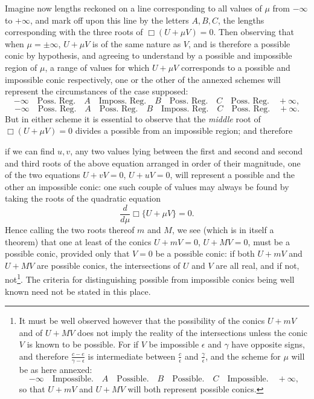 \documentclass[11pt]{article}
\newcommand{\sourcepage}[1]{\marginpar{\scriptsize p.~#1}}
\begin{document}
Imagine now lengths reckoned on a line corresponding to all values of $\mu$ from $-\infty$ to $+\infty$, and mark off upon this line by the letters $A,B,C$, the lengths corresponding with the three roots of $\Box(U+\mu V)=0$. Then observing that when $\mu=\pm\infty$, $U+\mu V$ is of the same nature as $V$, and is therefore a possible conic by hypothesis, and agreeing to understand by a possible and impossible region of $\mu$, a range of values for which $U+\mu V$ corresponds to a possible and impossible conic respectively, one or the other of the annexed schemes will represent the circumstances of the case supposed:
\[
-\infty\quad\text{Poss. Reg.}\quad A\quad\text{Imposs. Reg.}\quad B\quad\text{Poss. Reg.}\quad C\quad\text{Poss. Reg.}\quad+\infty,
\]
\[
-\infty\quad\text{Poss. Reg.}\quad A\quad\text{Poss. Reg.}\quad B\quad\text{Imposs. Reg.}\quad C\quad\text{Poss. Reg.}\quad+\infty.
\]
But in either scheme it is essential to observe that the \emph{middle} root of $\Box(U+\mu V)=0$ divides a possible from an impossible region; and therefore

\sourcepage{125}
if we can find $u,v$, any two values lying between the first and second and second and third roots of the above equation arranged in order of their magnitude, one of the two equations $U+vV=0$, $U+uV=0$, will represent a possible and the other an impossible conic: one such couple of values may always be found by taking the roots of the quadratic equation
\[
\frac{d}{d\mu}\Box\{U+\mu V\}=0.
\]
Hence calling the two roots thereof $m$ and $M$, we see (which is in itself a theorem) that one at least of the conics $U+mV=0$, $U+MV=0$, must be a possible conic, provided only that $V=0$ be a possible conic: if both $U+mV$ and $U+MV$ are possible conics, the intersections of $U$ and $V$ are all real, and if not, not\footnote{It must be well observed however that the possibility of the conics $U+mV$ and of $U+MV$ does not imply the reality of the intersections unless the conic $V$ is known to be possible. For if $V$ be impossible $\epsilon$ and $\gamma$ have opposite signs, and therefore $\frac{c-e}{\gamma-\epsilon}$ is intermediate between $\frac{c}{\epsilon}$ and $\frac{\gamma}{\epsilon}$, and the scheme for $\mu$ will be as here annexed:
\[
-\infty\quad\text{Impossible.}\quad A\quad\text{Possible.}\quad B\quad\text{Possible.}\quad C\quad\text{Impossible.}\quad+\infty,
\]
so that $U+mV$ and $U+MV$ will both represent possible conics.}. The criteria for distinguishing possible from impossible conics being well known need not be stated in this place.
\end{document}
